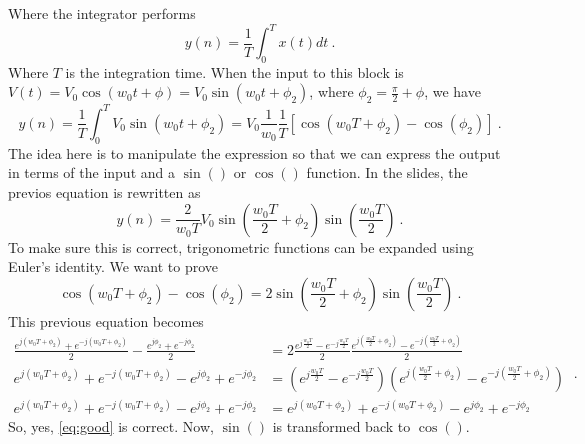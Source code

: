 \noindent Where the integrator performs
\begin{equation}
   y(n) = \frac{1}{T} \int_{0}^T x(t) dt \ .
\end{equation}
\noindent Where $T$ is the integration time. When the input to this block is $V(t) = V_0 \cos(w_0 t + \phi) = V_0 \sin(w_0 t + \phi_2)$, where $\phi_2 = \frac{\pi}{2} + \phi$, we have 
\begin{equation}
   y(n) = \frac{1}{T} \int_0^T V_0 \sin(w_0 t + \phi_2) = V_0 \frac{1}{w_0} \frac{1}{T} \left[ \cos(w_0 T + \phi_2) - \cos(\phi_2) \right] \ .
\end{equation}
\noindent The idea here is to manipulate the expression so that we can express the output in terms of the input and a $\sin()$ or $\cos()$ function. In the slides, the previos equation is rewritten as
\begin{equation} \label{eq:good}
   y(n) = \frac{2}{w_0 T} V_0 \sin(\frac{w_0 T}{2} + \phi_2) \sin\left(\frac{w_0 T}{2}\right) \ .
\end{equation}
\noindent To make sure this is correct, trigonometric functions can be expanded using Euler's identity. We want to prove 
\begin{equation}
   \cos(w_0 T + \phi_2) - \cos(\phi_2) = 2 \sin\left(\frac{w_0 T}{2} + \phi_2 \right) \sin\left(\frac{w_0 T}{2}\right) \ .
\end{equation}
\noindent This previous equation becomes
\begin{equation}
   \begin{split}
      \frac{e^{j \left( w_0 T + \phi_ 2\right)} + e^{- j (w_0 T + \phi_2)}}{2} - \frac{e^{j \phi_2} + e^{-j \phi_2}}{2} &= 2 \frac{e^{j \frac{w_0 T}{2}} - e^{-j \frac{w_0 T}{2}}}{2} \frac{e^{j \left( \frac{w_0 T}{2} + \phi_2 \right)} - e^{-j \left( \frac{w_0 T}{2} + \phi_2 \right)}}{2} \\
      e^{j \left(w_0 T + \phi_ 2\right)} + e^{-j (w_0 T + \phi_2)} - e^{j \phi_2} + e^{- j \phi_2} &= \left( e^{j \frac{w_0 T }{2}} - e^{-j \frac{w_0 T }{2}} \right) \left( e^{j \left(\frac{w_0 T}{2} + \phi_2 \right)} - e^{-j \left(\frac{w_0 T}{2} + \phi_2 \right)} \right) \\
      e^{j (w_0 T + \phi_2)} + e^{-j (w_0 T + \phi_2)} - e^{j \phi_2} + e^{-j \phi_2} &= e^{j (w_0 T + \phi_2)} + e^{-j (w_0 T + \phi_2)} - e^{j \phi_2} + e^{-j \phi_2}
   \end{split} \ .
\end{equation}
\noindent So, yes, \eqref{eq:good} is correct. Now, $\sin()$ is transformed back to $\cos()$.
